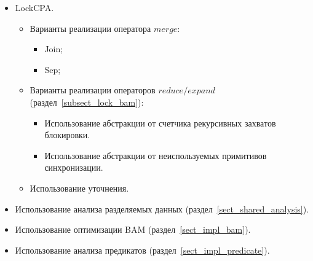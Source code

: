 \begin{itemize}
\item LockCPA.
\begin{itemize}
\item Варианты реализации оператора $merge$:
\begin{itemize}
\item Join;
\item Sep;
\end{itemize}
\item Варианты реализации операторов $reduce/expand$ (раздел~\ref{subsect_lock_bam}):
\begin{itemize}
\item Использование абстракции от счетчика рекурсивных захватов блокировки.
\item Использование абстракции от неиспользуемых примитивов синхронизации.
\end{itemize}
\item Использование уточнения.
\end{itemize}
\item Использование анализа разделяемых данных (раздел~\ref{sect_shared_analysis}).
\item Использование оптимизации BAM (раздел~\ref{sect_impl_bam}).
\item Использование анализа предикатов (раздел~\ref{sect_impl_predicate}).
\end{itemize}

